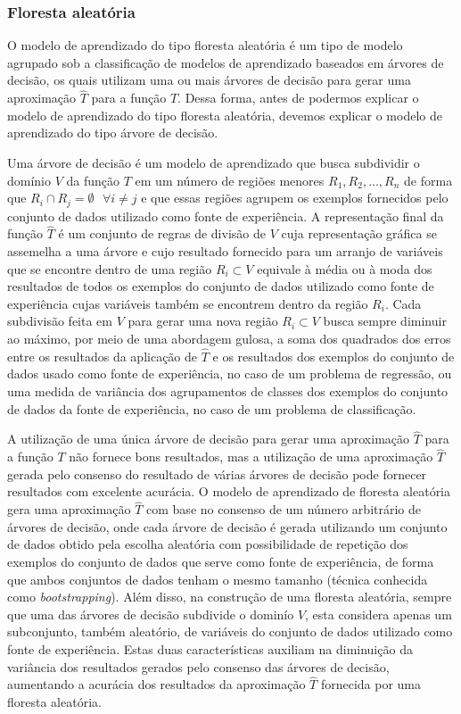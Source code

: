 \subsubsection{Floresta aleatória}

O modelo de aprendizado do tipo floresta aleatória é um tipo de modelo agrupado sob a classificação de modelos de aprendizado baseados em árvores de decisão, os quais utilizam uma ou mais árvores de decisão para gerar uma aproximação $\hat{T}$ para a função $T$. Dessa forma, antes de podermos explicar o modelo de aprendizado do tipo floresta aleatória, devemos explicar o modelo de aprendizado do tipo árvore de decisão.

Uma árvore de decisão é um modelo de aprendizado que busca subdividir o domínio $V$ da função $T$ em um número de regiões menores $R_{1}, R_{2}, ..., R_{n}$ de forma que $R_{i} \cap R_{j} = \emptyset \text{ } \forall i \ne j$ e que essas regiões agrupem os exemplos fornecidos pelo conjunto de dados utilizado como fonte de experiência. A representação final da função $\hat{T}$ é um conjunto de regras de divisão de $V$ cuja representação gráfica se assemelha a uma árvore e cujo resultado fornecido para um arranjo de variáveis que se encontre dentro de uma região $R_{i} \subset V$ equivale à média ou à moda dos resultados de todos os exemplos do conjunto de dados utilizado como fonte de experiência cujas variáveis também se encontrem dentro da região $R_{i}$\cite[p.303]{statistical_learning}. Cada subdivisão feita em $V$ para gerar uma nova região $R_{i} \subset V$ busca sempre diminuir ao máximo, por meio de uma abordagem gulosa, a soma dos quadrados dos erros entre os resultados da aplicação de $\hat{T}$ e os resultados dos exemplos do conjunto de dados usado como fonte de experiência, no caso de um problema de regressão, ou uma medida de variância dos agrupamentos de classes dos exemplos do conjunto de dados da fonte de experiência, no caso de um problema de classificação\cite[p.306-307, 312]{statistical_learning}.

A utilização de uma única árvore de decisão para gerar uma aproximação $\hat{T}$ para a função $T$ não fornece bons resultados, mas a utilização de uma aproximação $\hat{T}$ gerada pelo consenso do resultado de várias árvores de decisão pode fornecer resultados com excelente acurácia\cite[p.303]{statistical_learning}. O modelo de aprendizado de floresta aleatória gera uma aproximação $\hat{T}$ com base no consenso de um número arbitrário de árvores de decisão, onde cada árvore de decisão é gerada utilizando um conjunto de dados obtido pela escolha aleatória com possibilidade de repetição dos exemplos do conjunto de dados que serve como fonte de experiência, de forma que ambos conjuntos de dados tenham o mesmo tamanho (técnica conhecida como \textit{bootstrapping}). Além disso, na construção de uma floresta aleatória, sempre que uma das árvores de decisão subdivide o dominío $V$, esta considera apenas um subconjunto, também aleatório, de variáveis do conjunto de dados utilizado como fonte de experiência. Estas duas características auxiliam na diminuição da variância dos resultados gerados pelo consenso das árvores de decisão, aumentando a acurácia dos resultados da aproximação $\hat{T}$ fornecida por uma floresta aleatória\cite[p.316-321]{statistical_learning}.


